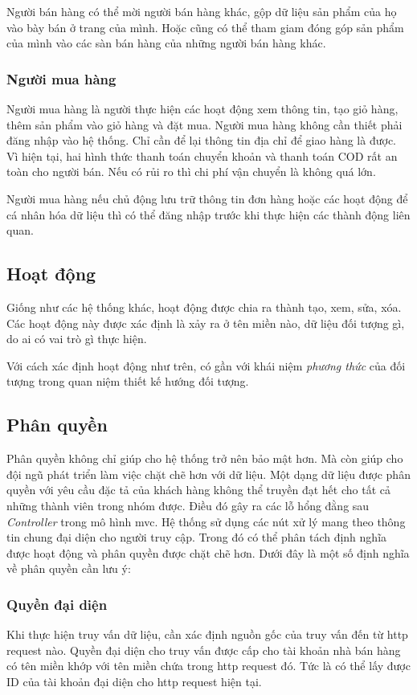 \documentclass[11pt]{report}
\begin{document}
	Người bán hàng có thể mời người bán hàng khác, gộp dữ liệu sản phẩm của họ vào bày bán ở trang của mình. Hoặc cũng có thể tham giam đóng góp sản phẩm của mình vào các sàn bán hàng của những người bán hàng khác.
	
	\subsubsection{Người mua hàng}
	Người mua hàng là người thực hiện các hoạt động xem thông tin, tạo giỏ hàng, thêm sản phẩm vào giỏ hàng và đặt mua. Người mua hàng không cần thiết phải đăng nhập vào hệ thống. Chỉ cần để lại thông tin địa chỉ để giao hàng là được. Vì hiện tại, hai hình thức thanh toán chuyển khoản và thanh toán COD rất an toàn cho người bán. Nếu có rủi ro thì chi phí vận chuyển là không quá lớn.
	
	Người mua hàng nếu chủ động lưu trữ thông tin đơn hàng hoặc các hoạt động để cá nhân hóa dữ liệu thì có thể đăng nhập trước khi thực hiện các thành động liên quan.
	
	\subsection{Hoạt động}
	Giống như các hệ thống khác, hoạt động được chia ra thành tạo, xem, sửa, xóa. Các hoạt động này được xác định là xảy ra ở tên miền nào, dữ liệu đối tượng gì, do ai có vai trò gì thực hiện.
	
	Với cách xác định hoạt động như trên, có gần với khái niệm \emph{phương thức} của đối tượng trong quan niệm thiết kế hướng đối tượng.
	
	\subsection{Phân quyền}
	
	Phân quyền không chỉ giúp cho hệ thống trở nên bảo mật hơn. Mà còn giúp cho đội ngũ phát triển làm việc chặt chẽ hơn với dữ liệu. Một dạng dữ liệu được phân quyền với yêu cầu đặc tả của khách hàng không thể truyền đạt hết cho tất cả những thành viên trong nhóm được. Điều đó gây ra các lỗ hổng đằng sau \emph{Controller} trong mô hình \acrshort{mvc}. Hệ thống sử dụng các nút xử lý mang theo thông tin chung đại diện cho người truy cập. Trong đó có thể phân tách định nghĩa được hoạt động và phân quyền được chặt chẽ hơn. Dưới đây là một số định nghĩa về phân quyền cần lưu ý:
	
	\subsubsection{Quyền đại diện}\label{what-is-owner}
	Khi thực hiện truy vấn dữ liệu, cần xác định nguồn gốc của truy vấn đến từ \acrshort{http} request nào. Quyền đại diện cho truy vấn được cấp cho tài khoản nhà bán hàng có tên miền khớp với tên miền chứa trong \acrshort{http} request đó. Tức là có thể lấy được ID của tài khoản đại diện cho \acrshort{http} request hiện tại. 
	
\end{document}
